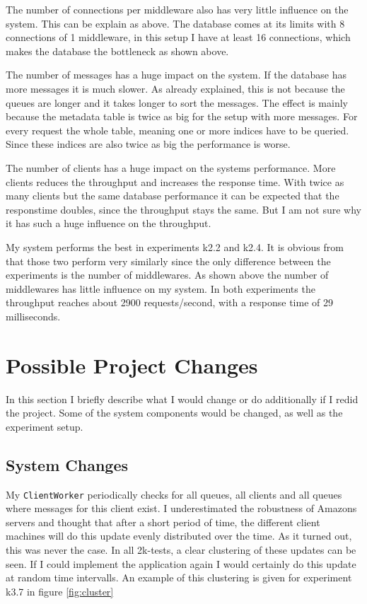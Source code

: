 \documentclass[
10pt, %
a4paper, %
oneside, %
headinclude,footinclude, %
BCOR5mm, %
]{scrartcl}
\begin{document}
The number of connections per middleware also has very little influence on the system. This can be explain as above. The database comes at its limits with 8 connections of 1 middleware, in this setup I have at least 16 connections, which makes the database the bottleneck as shown above.

The number of messages has a huge impact on the system. If the database has more messages it is much slower. As already explained, this is not because the queues are longer and it takes longer to sort the messages. The effect is mainly because the metadata table is twice as big for the setup with more messages. For every request the whole table, meaning one or more indices have to be queried. Since these indices are also twice as big the performance is worse. 


The number of clients has a huge impact on the systems performance. More clients reduces the throughput and increases the response time. With twice as many clients but the same database performance it can be expected that the responstime doubles, since the throughput stays the same. But I am not sure why it has such a huge influence on the throughput.



My system performs the best in experiments k2.2 and k2.4. It is obvious from that those two perform very similarly since the only difference between the experiments is the number of middlewares. As shown above the number of middlewares has little influence on my system. In both experiments the throughput reaches about 2900 requests/second, with a response time of 29 milliseconds.

\section{Possible Project Changes}
In this section I briefly describe what I would change or do additionally if I redid the project. Some of the system components would be changed, as well as the experiment setup.
\subsection{System Changes}
\label{changes}
My \texttt{ClientWorker} periodically checks for all queues, all clients and all queues where messages for this client exist. I underestimated the robustness of Amazons servers and thought that after a short period of time, the different client machines will do this update evenly distributed over the time. As it turned out, this was never the case. In all 2k-tests, a clear clustering of these updates can be seen. If I could implement the application again I would certainly do this update at random time intervalls. An example of this clustering is given for experiment k3.7 in figure \vref{fig:cluster}
\end{document}
